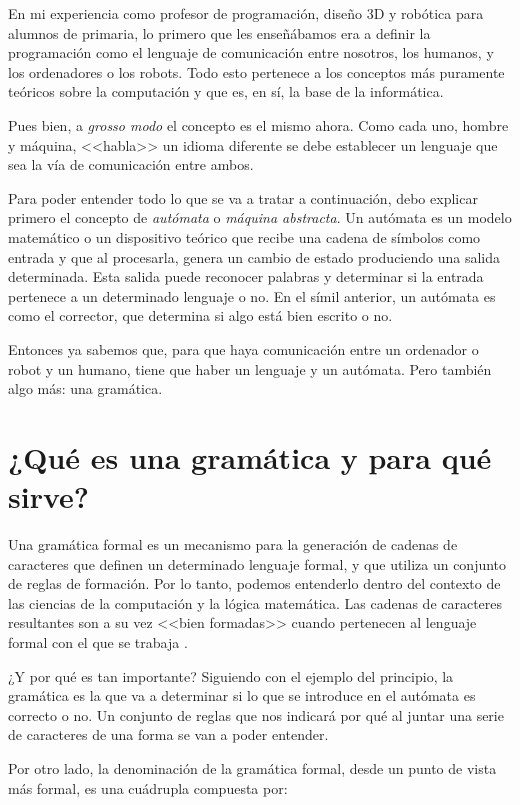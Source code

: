 
En mi experiencia como profesor de programación, diseño 3D y robótica para alumnos de primaria, lo primero que les enseñábamos era a definir la programación como el lenguaje de comunicación entre nosotros, los humanos, y los ordenadores o los robots. Todo esto pertenece a los conceptos más puramente teóricos sobre la computación y que es, en sí, la base de la informática. 

Pues bien, a \emph{grosso modo} el concepto es el mismo ahora. Como cada uno, hombre y máquina, <<habla>> un idioma diferente se debe establecer un lenguaje que sea la vía de comunicación entre ambos. 

Para poder entender todo lo que se va a tratar a continuación, debo explicar primero el concepto de \textit{autómata} o \textit{máquina abstracta}. Un autómata es un modelo matemático o un dispositivo teórico que recibe una cadena de símbolos como entrada y que al procesarla, genera un cambio de estado produciendo una salida determinada. Esta salida puede reconocer palabras y determinar si la entrada pertenece a un determinado lenguaje o no. En el símil anterior, un autómata es como el corrector, que determina si algo está bien escrito o no. 

Entonces ya sabemos que, para que haya comunicación entre un ordenador o robot y un humano, tiene que haber un lenguaje y un autómata. Pero también algo más: una gramática.

\section{¿Qué es una gramática y para qué sirve?}

Una gramática formal es un mecanismo para la generación de cadenas de caracteres que definen un determinado lenguaje formal, y que utiliza un conjunto de reglas de formación. Por lo tanto, podemos entenderlo dentro del contexto de las ciencias de la computación y la lógica matemática. Las cadenas de caracteres resultantes son a su vez <<bien formadas>> cuando pertenecen al lenguaje formal con el que se trabaja \cite{aho1986compilers}.

¿Y por qué es tan importante? Siguiendo con el ejemplo del principio, la gramática es la que va a determinar si lo que se introduce en el autómata es correcto o no. Un conjunto de reglas que nos indicará por qué al juntar una serie de caracteres de una forma se van a poder entender.

Por otro lado, la denominación de la gramática formal, desde un punto de vista más formal, es una cuádrupla compuesta por:

